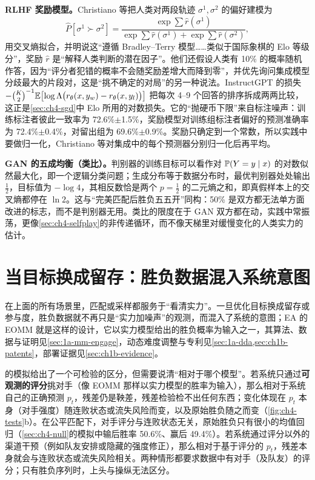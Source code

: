 \textbf{RLHF 奖励模型。}Christiano 等把人类对两段轨迹 $\sigma^1,\sigma^2$ 的偏好建模为
\[
\hat P[\sigma^1\succ\sigma^2]=\frac{\exp\sum\hat r(\sigma^1)}{\exp\sum\hat r(\sigma^1)+\exp\sum\hat r(\sigma^2)},
\]
用交叉熵拟合，并明说这“遵循 Bradley–Terry 模型……类似于国际象棋的 Elo 等级分”，奖励 $\hat r$ 是“解释人类判断的潜在因子”\cite{christiano2017deep}\tagLit。他们还假设人类有 10\% 的概率随机作答，因为“评分者犯错的概率不会随奖励差增大而降到零”，并优先询问集成模型分歧最大的片段对，这是“挑不确定的对局”的另一种说法\cite{christiano2017deep}\tagLit。InstructGPT 的损失 $-\binom{K}{2}^{-1}\mathbb{E}\bigl[\log\Lambda\bigl(r_\theta(x,y_w)-r_\theta(x,y_l)\bigr)\bigr]$ 把每次 4–9 个回答的排序拆成两两比较\cite{ouyang2022training}\tagLit，这正是\cref{sec:ch4-sgd}中 Elo 所用的对数损失。它的“抛硬币下限”来自标注噪声：训练标注者彼此一致率为 72.6\%$\pm$1.5\%，奖励模型对训练组标注者偏好的预测准确率为 72.4\%$\pm$0.4\%，对留出组为 69.6\%$\pm$0.9\%\cite{ouyang2022training}\tagLit。奖励只确定到一个常数，所以实践中要做归一化，Christiano 等对集成中的每个预测器分别归一化后再平均\cite{christiano2017deep}\tagLit。

\textbf{GAN 的五成均衡（类比）。}判别器的训练目标可以看作对 $\mathbb{P}(Y=y\mid x)$ 的对数似然最大化，即一个逻辑分类问题；生成分布等于数据分布时，最优判别器处处输出 $\tfrac12$，目标值为 $-\log4$，其相反数恰是两个 $p=\tfrac12$ 的二元熵之和，即真假样本上的交叉熵都停在 $\ln2$\cite{goodfellow2014generative}\tagLit。这与“完美匹配后胜负五五开”同构：50\% 是双方都无法单方面改进的标志，而不是判别器无用。类比的限度在于 GAN 双方都在动，实践中常振荡，更像\cref{sec:ch4-selfplay}的非传递循环，而不像天梯里对缓慢变化的人类实力的估计。

\section{当目标换成留存：胜负数据混入系统意图}
\label{sec:ch4-retention}

在上面的所有场景里，匹配或采样都服务于“看清实力”。一旦优化目标换成留存或参与度，胜负数据就不再只是“实力加噪声”的观测，而混入了系统的意图；EA 的 EOMM 就是这样的设计，它以实力模型给出的胜负概率为输入之一，其算法、数据与证明见\cref{sec:1a-mm-engage}，动态难度调整与专利见\cref{sec:1a-dda,sec:ch1b-patents}，部署证据见\cref{sec:ch1b-evidence}。

的模拟给出了一个可检验的区分，但需要说清“相对于哪个模型”。若系统只通过\textbf{可观测的评分}挑对手（像 EOMM 那样以实力模型的胜率为输入），那么相对于系统自己的正确预测 $p_t$，残差仍是鞅差，残差检验检不出任何东西；变化体现在 $p_t$ 本身（对手强度）随连败状态或流失风险而变，以及原始胜负随之而变（\cref{fig:ch4-tests}b）。在公平匹配下，对手评分与连败状态无关，原始胜负只有很小的均值回归（\cref{sec:ch4-null}的模拟中输后胜率 50.6\%、赢后 49.4\%）。若系统通过评分以外的渠道干预（例如队友安排或隐藏的强度修正），那么相对于基于评分的 $p_t$，残差本身就会与连败状态或流失风险相关。两种情形都要求数据中有对手（及队友）的评分；只有胜负序列时，上头与操纵无法区分。

